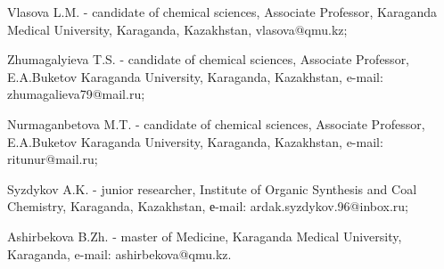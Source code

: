 Vlasova L.M. - candidate of chemical sciences, Associate Professor,
Karaganda Medical University, Karaganda, Kazakhstan,
vlasova@qmu.kz;

Zhumagalyieva T.S. - candidate of chemical sciences, Associate
Professor, E.A.Buketov Karaganda University, Karaganda, Kazakhstan,
e-mail: zhumagalieva79@mail.ru;

Nurmaganbetova M.T. - candidate of chemical sciences, Associate
Professor, E.A.Buketov Karaganda University, Karaganda, Kazakhstan,
e-mail: ritunur@mail.ru;

Syzdykov A.K. - junior researcher, Institute of Organic Synthesis and
Coal Chemistry, Karaganda, Kazakhstan, е-mail:
ardak.syzdykov.96@inbox.ru;

Ashirbekova B.Zh. - master of Medicine, Karaganda Medical University,
Karaganda, e-mail:
ashirbekova@qmu.kz.
